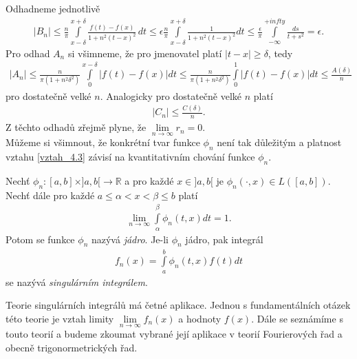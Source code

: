Odhadneme jednotlivě
\begin{align*}
|B_n| \leq \frac{n}{\pi} \int \limits_{x-\delta}^{x+\delta} \frac{f(t) - f(x)}{1 +  n^2 (t-x)^2} \, dt \leq \epsilon \frac{n}{\pi} \int \limits_{x-\delta}^{x+\delta} \frac{1}{1+n^2(t-x)^2} dt \leq \frac{\epsilon}{\pi} \int \limits_{-\infty}^{+infty} \frac{ds}{t+s^2} = \epsilon.
\end{align*}
Pro odhad $A_n$ si všimneme, že pro jmenovatel platí $|t-x| \geq \delta$, tedy
\begin{align*}
|A_n| \leq \frac{n}{\pi (1 + n^2 \delta^2)} \int \limits_0^{x-\delta} |f(t) - f(x)| dt \leq \frac{n}{\pi (1 + n^2 \delta^2)} \int \limits_0^1 |f(t) - f(x)| dt \leq \frac{A(\delta)}{n}
\end{align*}
pro dostatečně velké $n$. Analogicky pro dostatečně velké $n$ platí
\begin{align*}
|C_n| \leq \frac{C(\delta)}{n}.
\end{align*}
Z těchto odhadů zřejmě plyne, že $\lim \limits _{n \to \infty} r_n = 0$.\\
Můžeme si všimnout, že konkrétní tvar funkce $\phi_n$ není tak d\r uležitým a platnost vztahu \eqref{vztah_4.3} závisí na kvantitativním chování funkce $\phi_n$.

\begin{definition}
\label{d_4.1.definition}
Nechť $\phi_n : [a,b] \times ]a,b[ \rightarrow \mathbb{R}$ a pro každé $x \in ]a,b[$ je $\phi_n (\cdot, x) \in L([a,b])$. Nechť dále pro každé $a \leq \alpha < x < \beta \leq b$ platí
\begin{align*}
\lim_{n \rightarrow \infty} \int \limits_{\alpha}^{\beta} \phi_n (t,x) dt = 1.
\end{align*}
Potom se funkce $\phi_n$ nazývá \textit{jádro}. Je-li $\phi_n$ jádro, pak integrál
\begin{align*}
f_n (x) = \int \limits_a^b \phi_n (t,x) f(t) dt
\end{align*}
se nazývá \textit{singulárním integrálem}.
\end{definition}


Teorie singulárních integrálů má četné aplikace. Jednou s fundamentálních otázek této teorie je vztah limity $\lim \limits _{n \rightarrow \infty} f_n(x)$ a hodnoty $f(x)$. Dále se seznámíme s touto teorií a budeme zkoumat vybrané její aplikace v teorií Fourierových řad a obecně trigonormetrických řad.

